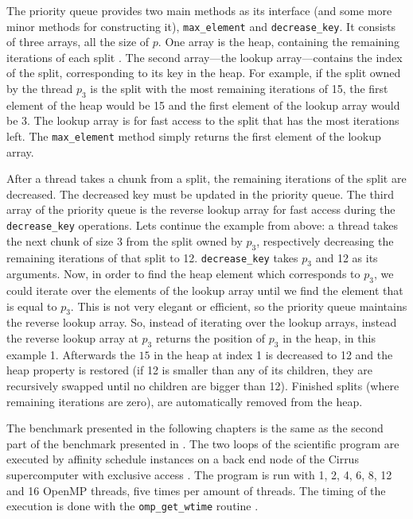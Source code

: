 \documentclass[twoside,11pt]{article}
\begin{document}
The priority queue provides two main methods as its
interface (and some more minor methods for constructing
it), \texttt{max\_element} and \texttt{decrease\_key}.
It consists of three arrays, all the size of $p$.
One array is the heap, containing the remaining iterations
of each split \citep[see][Chapter 6]{cormen}.
The second array---the lookup array---contains the index of
the split, corresponding to its key in the heap.
For example, if the split owned by the thread $p_3$ is the
split with the most remaining iterations of 15, the first
element of the heap would be 15 and the first element of
the lookup array would be 3.
The lookup array is for fast access to the split that has
the most iterations left.
The \texttt{max\_element} method simply returns the first
element of the lookup array.

After a thread takes a chunk from a split, the remaining
iterations of the split are decreased.
The decreased key must be updated in the priority queue.
The third array of the priority queue is the reverse
lookup array for fast access during the
\texttt{decrease\_key} operations.
Lets continue the example from above: a thread takes the
next chunk of size 3 from the split owned by $p_3$,
respectively decreasing the remaining iterations of that
split to 12.
\texttt{decrease\_key} takes $p_3$ and 12 as its arguments.
Now, in order to find the heap element which corresponds
to $p_3$, we could iterate over the elements of the
lookup array until we find the element that is equal to
$p_3$.
This is not very elegant or efficient, so the priority
queue maintains the reverse lookup array.
So, instead of iterating over the lookup arrays, instead
the reverse lookup array at $p_3$ returns the position of
$p_3$ in the heap, in this example 1.
Afterwards the $15$ in the heap at index 1 is decreased to
12 and the heap property is restored (if 12 is smaller than
any of its children, they are recursively swapped until no
children are bigger than 12).
Finished splits (where remaining iterations are zero),
are automatically removed from the heap.


The benchmark presented in the following chapters is the
same as the second part of the benchmark presented in
\citet{b1}.
The two loops of the scientific program are executed by
affinity schedule instances on a back end node of the
Cirrus supercomputer with exclusive access
\citep[see][]{cirrus}.
The program is run with 1, 2, 4, 6, 8, 12 and 16 OpenMP
threads, five times per amount of threads.
The timing of the execution is done with the
\texttt{omp\_get\_wtime} routine
\citep[see][Chapter 3]{omp}.
\end{document}
